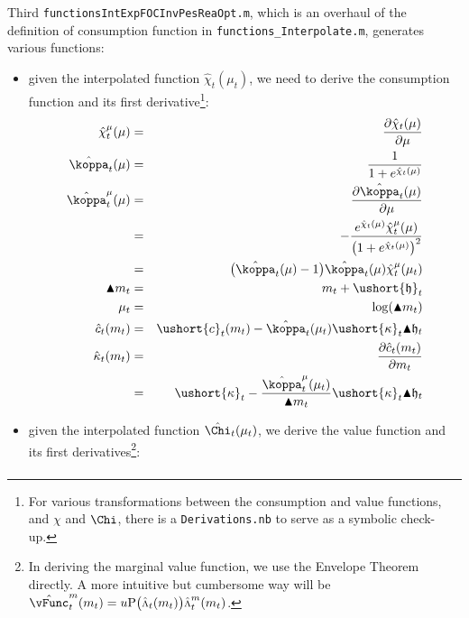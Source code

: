 \documentclass[titlepage,abstract]{\econtex}
\providecommand{\vInv}{\ensuremath{\scriptstyle \Lambda \displaystyle}}
\begin{document}
Third \texttt{functionsIntExpFOCInvPesReaOpt.m}, which is an overhaul of the definition of consumption function in \texttt{functions\_Interpolate.m}, generates various functions:
\begin{itemize}
        \item given the interpolated function $\hat{\chi}_{t}(\mu_{t})$, we need to derive the consumption function and its first derivative\footnote{For various transformations between the consumption and value functions, and $\chi$ and $\Chi$, there is a \texttt{Derivations.nb} to serve as a symbolic check-up.}:
            \begin{eqnarray}
            \hat{\chi}^{\mu}_{t}(\mu) &=& \frac{\partial \hat{\chi}_{t}(\mu)}{\partial \mu} \\
            \hat{\koppa}_{t} (\mu) &=&\frac{1}{1+e^{\hat{\chi}_{t}(\mu)}} \\
            \hat{\koppa}^{\mu}_{t} (\mu) &=& \frac{\partial \hat{\koppa}_{t} (\mu)}{\partial \mu} \\
            &=& -\frac{e^{\hat{\chi}_{t}(\mu)} \hat{\chi}^{\mu}_{t}(\mu)}{\big(1+e^{\hat{\chi}_{t}(\mu)}\big)^{2}} \\
            &=& \big(\hat{\koppa}_{t} (\mu)-1\big)\hat{\koppa}_{t} (\mu) \hat{\chi}^{\mu}_{t}(\mu_{t}) \\
            \blacktriangle m_{t} &=& m_{t} + \ushort{\mathfrak{h}}_{t} \\
            \mu_{t} &=& \log(\blacktriangle m_{t}) \\
            \hat{c}_{t}(m_{t}) &=& \ushort{c}_{t}(m_{t})-\hat{\koppa}_{t}(\mu_{t}) \ushort{\kappa}_{t} \blacktriangle \mathfrak{h}_{t} \\
            \hat{\kappa}_{t}(m_{t}) &=& \frac{\partial \hat{c}_{t}(m_{t})}{\partial m_{t}} \\
            &=& \ushort{\kappa}_{t}-\frac{\hat{\koppa}^{\mu}_{t}(\mu_{t})}{\blacktriangle m_{t}} \ushort{\kappa}_{t} \blacktriangle \mathfrak{h}_{t} \\
            \end{eqnarray}
        \item given the interpolated function $\hat{\Chi}_{t}(\mu_{t})$, we derive the value function and its first derivatives\footnote{In deriving the marginal value function, we use the Envelope Theorem directly. A more intuitive but cumbersome way will be $\hat{\vFunc}_{t}^{m} (m_{t}) = u\text{P}\big(\hat{\vInv}_{t}(m_{t})\big) \hat{\vInv}_{t}^{m} (m_{t})$.}:
            \begin{eqnarray}

\end{eqnarray}
\end{itemize}
\end{document}
